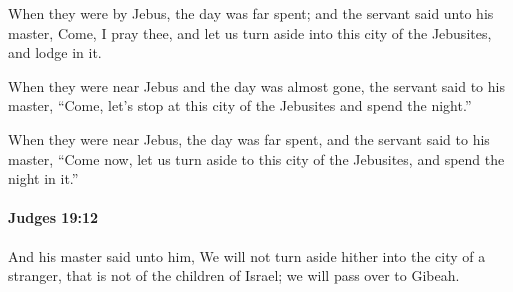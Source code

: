 			\begin{versebox}
					\item[BHS] 
					\item[ASV] When they were by Jebus, the day was far spent; and the servant said unto his master, Come, I pray thee, and let us turn aside into this city of the Jebusites, and lodge in it.
					\item[NIV] When they were near Jebus and the day was almost gone, the servant said to his master, “Come, let’s stop at this city of the Jebusites and spend the night.”
					\item[NRSV] When they were near Jebus, the day was far spent, and the servant said to his master, “Come now, let us turn aside to this city of the Jebusites, and spend the night in it.”
			\end{versebox}

		\paragraph{Judges 19:12} %
			\label{JUDGES-19-12}

			And his master said unto him, We will not turn aside hither into the city of a stranger, that is not of the children of Israel; we will pass over to Gibeah.

